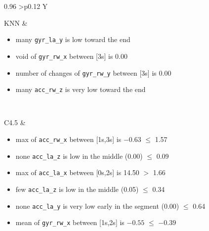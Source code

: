 \documentclass[preprint,12pt]{elsarticle}
\begin{document}
\begin{table}[!ht]
\centering
\tiny
\caption{Illustrative interpretability examples for a shared test instance across models (prediction: \emph{Climbing stairs}).}
\label{tab:interpretability_examples_compact}

\renewcommand{\arraystretch}{0.92}
\setlength{\tabcolsep}{3pt}


\newlength{\InnerColW}
\setlength{\InnerColW}{0.37\linewidth}

\begin{tabularx}{0.96\textwidth}{
  >{\RaggedRight\arraybackslash\bfseries}p{}
  Y
}
\toprule

KNN &
\begin{itemize}[leftmargin=*,nosep,topsep=0pt]
  \item many \texttt{gyr\_la\_y} is low toward the end
  \item void of \texttt{gyr\_rw\_x} between [3s] is 0.00
  \item number of changes of \texttt{gyr\_rw\_y} between [3s] is 0.00
  \item many \texttt{acc\_rw\_z} is very low toward the end
\end{itemize}
\\
\midrule

C4.5 &
\begin{itemize}[leftmargin=*,nosep,topsep=0pt]
  \item max of \texttt{acc\_rw\_x} between [1s,3s] is $-0.63$ $\le$ 1.57
  \item none \texttt{acc\_la\_z} is low in the middle (0.00) $\le$ 0.09
  \item max of \texttt{acc\_la\_x} between [0s,2s] is 14.50 $>$ 1.66
  \item few \texttt{acc\_la\_z} is low in the middle (0.05) $\le$ 0.34
  \item none \texttt{acc\_la\_y} is very low early in the segment (0.00) $\le$ 0.64
  \item mean of \texttt{gyr\_rw\_x} between [1s,2s] is $-0.55$ $\le$ $-0.39$
\end{itemize}
\\
\midrule


\end{tabularx}
\end{table}
\end{document}
